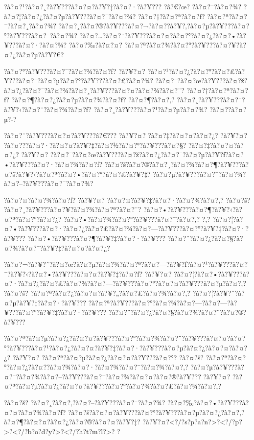\documentclass[11pt, openany]{book}
\begin{document}
{{{{{{{{{{{?à?¤?¹?à?¤?¸?à?¥???à?¤?¤?à?¥?‡?à?¤?·?à?¥??? ?â?€?œ? ?à?¤?¯?à?¤?¾?
?à?¤?¦?à?¤?¿?à?¤?µ?à?¥???à?¤?¯?à?¤?¾? ?à?¤?†?à?¤?ª?à?¤?ƒ?
?à?¤?ª?à?¤?¯?à?¤?¸?à?¤?¾?
?à?¤?¸?à?¤?®?à?¥???à?¤?¬?à?¤?­?à?¥?‚?à?¤?µ?à?¥???à?¤?°?à?¥???à?¤?¯?à?¤?¾?
?à?¤?\ldots{}?à?¤?¨?à?¥???à?¤?¤?à?¤?°?à?¤?¿?à?¤?•?à?¥???à?¤?·?à?¤?¾?
?à?¤?‰?à?¤?¤? ?à?¤?ª?à?¤?¾?à?¤?°?à?¥???à?¤?¥?à?¤?¿?à?¤?µ?à?¥?€?

?à?¤?°?à?¥???à?¤?¯?à?¤?¾?à?¤?ƒ? ?à?¥?¤?
?à?¤?¹?à?¤?¿?à?¤?°?à?¤?£?à?¥???à?¤?¯?à?¤?µ?à?¤?°?à?¥???à?¤?£?à?¤?¾?
?à?¤?¯?à?¤?œ?à?¥???à?¤?ž?à?¤?¿?à?¤?¯?à?¤?¾?à?¤?¸?à?¥???à?¤?¤?à?¤?¾?à?¤?¨?
?à?¤?†?à?¤?ª?à?¤?ƒ? ?à?¤?¶?à?¤?¿?à?¤?µ?à?¤?¾?à?¤?ƒ? ?à?¤?¶?à?¤?‚?
?à?¤?¸?à?¥???à?¤?¯?à?¥?‹?à?¤?¨?à?¤?¾?à?¤?ƒ?
?à?¤?¸?à?¥???à?¤?¹?à?¤?µ?à?¤?¾? ?à?¤?­?à?¤?µ?-?

?à?¤?¨?à?¥???à?¤?¤?à?¥???â?€??? ?à?¥?¤? ?à?¤?‡?à?¤?¤?à?¤?¿? ?à?¥?¤?
?à?¤???à?¤?·?à?¤?¤?à?¥?‡?à?¤?½?à?¤?°?à?¥???à?¤?§? ?à?¤?‡?à?¤?¤?à?¤?¿?
?à?¥?¤?
?à?¤?¯?à?¤?œ?à?¥???à?¤?ž?à?¤?¿?à?¤?¯?à?¤?µ?à?¥?ƒ?à?¤?•?à?¥???à?¤?·?à?¤?¾?à?¤?ƒ?
?à?¤?š?à?¤?®?à?¤?¸?à?¤?¾?à?¤?¶?à?¥???à?¤?š?à?¥?‹?à?¤?ª?à?¤?•?à?¤?°?à?¤?£?à?¥?‡?
?à?¤?µ?à?¥???à?¤?¯?à?¤?¾?à?¤?--?à?¥???à?¤?¯?à?¤?¾?

?à?¤?¤?à?¤?¾?à?¤?ƒ? ?à?¥?¤? ?à?¤?¤?à?¥?‡?à?¤?·?à?¤?¾?à?¤?‚? ?à?¤?š?
?à?¤?¸?à?¥???à?¤?¥?à?¤?¾?à?¤?ª?à?¤?¨?
?à?¤?•?à?¥???à?¤?¶?à?¥?‹?à?¤?ª?à?¤?°?à?¤?¿?
?à?¤?•?à?¤?¾?à?¤?°?à?¥???à?¤?¯?à?¤?‚? ?,?
?à?¤?¦?à?¤?•?à?¥???à?¤?·?à?¤?¿?à?¤?£?à?¤?¾?à?¤?---?à?¥???à?¤?°?à?¥?‡?à?¤?·?à?¥???
?à?¤?•?à?¥???à?¤?¶?à?¥?‡?à?¤?·?à?¥???
?à?¤?¨?à?¤?¿?à?¤?§?à?¤?¾?à?¤?¯?à?¥?‡?à?¤?¤?à?¤?¿?

?à?¤?¬?à?¥?ˆ?à?¤?œ?à?¤?µ?à?¤?¾?à?¤?ª?à?¤?---?à?¥?ƒ?à?¤?¹?à?¥???à?¤?¯?à?¥?‹?à?¤?•?à?¥???à?¤?¤?à?¥?‡?à?¤?ƒ?
?à?¥?¤?
?à?¤?¦?à?¤?•?à?¥???à?¤?·?à?¤?¿?à?¤?£?à?¤?¾?à?¤?---?à?¥???à?¤?°?à?¤?¤?à?¥???à?¤?µ?à?¤?‚?
?à?¤?š? ?à?¤?ª?à?¤?¿?à?¤?¤?à?¥?„?à?¤?£?à?¤?¾?à?¤?‚?
?à?¤?¦?à?¥?ˆ?à?¤?µ?à?¥?‡?à?¤?·?à?¥???
?à?¤?ª?à?¥???à?¤?°?à?¤?¾?à?¤?---?à?¤?---?à?¥???à?¤?°?à?¥?‡?à?¤?·?à?¥???
?à?¤?¨?à?¤?¿?à?¤?§?à?¤?¾?à?¤?¨?à?¤?®?à?¥???

?à?¤?ª?à?¤?µ?à?¤?¿?à?¤?¤?à?¥???à?¤?°?à?¤?¾?à?¤?¨?à?¥???à?¤?¤?à?¤?°?à?¥???à?¤?¹?à?¤?¿?à?¤?¤?à?¥?‡?à?¤?·?à?¥???à?¤?µ?à?¤?¿?à?¤?¤?à?¤?¿?
?à?¥?¤? ?à?¤?ª?à?¤?µ?à?¤?¿?à?¤?¤?à?¥???à?¤?°? ?à?¤?š?
?à?¤?ª?à?¤?°?à?¤?¿?à?¤?­?à?¤?¾?à?¤?·?à?¤?¾?à?¤?¯?à?¤?¾?à?¤?‚?
?à?¤?µ?à?¥???à?¤?¯?à?¤?¾?à?¤?--?à?¥???à?¤?¯?à?¤?¾?à?¤?¤?à?¤?®?à?¥???
?à?¥?¤? ?à?¤?ª?à?¤?µ?à?¤?¿?à?¤?¤?à?¥???à?¤?°?à?¤?¾?à?¤?£?à?¤?¾?à?¤?‚?

?à?¤?š? ?à?¤?¸?à?¤?‚?à?¤?--?à?¥???à?¤?¯?à?¤?¾?
?à?¤?‰?à?¤?•?à?¥???à?¤?¤?à?¤?¾?à?¤?ƒ?
?à?¤?š?à?¤?¤?à?¥???à?¤?°?à?¥???à?¤?µ?à?¤?¿?à?¤?‚?à?¤?¶?à?¤?¤?à?¤?¿?à?¤?®?à?¤?¤?à?¥?‡?
?à?¥?¤?\textless{}?/?s?p?a?n?\textgreater{}?\textless{}?/?p?\textgreater{}?\textless{}?/?b?o?d?y?\textgreater{}?\textless{}?/?h?t?m?l?\textgreater{}?
?

}}}}}}}}}}}
\end{document}
